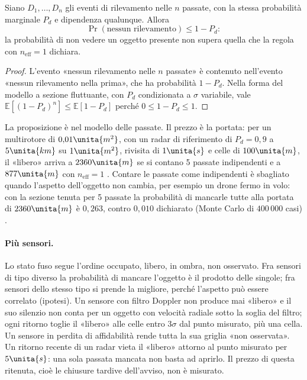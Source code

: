 \begin{proposizione}[La regola con $n_{\mathrm{eff}}=1$ è prudente per ogni correlazione]\label{prop:lp-correlate}
Siano $D_1,\dots,D_n$ gli eventi di rilevamento nelle $n$ passate, con la stessa probabilità marginale $P_d$ e dipendenza qualunque. Allora
\[\Pr(\text{nessun rilevamento})\le 1-P_d :\]
la probabilità di non vedere un oggetto presente non supera quella che la regola con $n_{\mathrm{eff}}=1$ dichiara.
\end{proposizione}
\begin{proof}
L'evento «nessun rilevamento nelle $n$ passate» è contenuto nell'evento «nessun rilevamento nella prima», che ha probabilità $1-P_d$. Nella forma del modello a sezione fluttuante, con $P_d$ condizionata a $\sigma$ variabile, vale $\mathbb{E}[(1-P_d)^n]\le\mathbb{E}[1-P_d]$ perché $0\le1-P_d\le1$.
\end{proof}
La proposizione è  nel modello delle passate. Il prezzo è la portata: per un multirotore di $0{,}01\unita{m^2}$, con un radar di riferimento di $P_d=0{,}9$ a $5\unita{km}$ su $1\unita{m^2}$, rivisita di $1\unita{s}$ e celle di $100\unita{m}$, il «libero» arriva a $2360\unita{m}$ se si contano 5 passate indipendenti e a $877\unita{m}$ con $n_{\mathrm{eff}}=1$ . Contare le passate come indipendenti è sbagliato quando l'aspetto dell'oggetto non cambia, per esempio un drone fermo in volo: con la sezione tenuta per 5 passate la probabilità di mancarle tutte alla portata di $2360\unita{m}$ è $0{,}263$, contro $0{,}010$ dichiarato (Monte Carlo di $400\,000$ casi) .

\paragraph{Più sensori.} Lo stato fuso segue l'ordine occupato, libero, in ombra, non osservato. Fra sensori di tipo diverso la probabilità di mancare l'oggetto è il prodotto delle singole; fra sensori dello stesso tipo si prende la migliore, perché l'aspetto può essere correlato (ipotesi). Un sensore con filtro Doppler non produce mai «libero» e il suo silenzio non conta per un oggetto con velocità radiale sotto la soglia del filtro; ogni ritorno toglie il «libero» alle celle entro $3\sigma$ dal punto misurato, più una cella. Un sensore in perdita di affidabilità rende tutta la sua griglia «non osservata». Un ritorno recente di un radar vieta il «libero» attorno al punto misurato per $5\unita{s}$: una sola passata mancata non basta ad aprirlo. Il prezzo di questa ritenuta, cioè le chiusure tardive dell'avviso, non è misurato.

